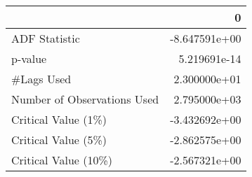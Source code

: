 \begin{tabular}{lr}
\toprule
{} &             0 \\
\midrule
ADF Statistic               & -8.647591e+00 \\
p-value                     &  5.219691e-14 \\
\#Lags Used                  &  2.300000e+01 \\
Number of Observations Used &  2.795000e+03 \\
Critical Value (1\%)         & -3.432692e+00 \\
Critical Value (5\%)         & -2.862575e+00 \\
Critical Value (10\%)        & -2.567321e+00 \\
\bottomrule
\end{tabular}
